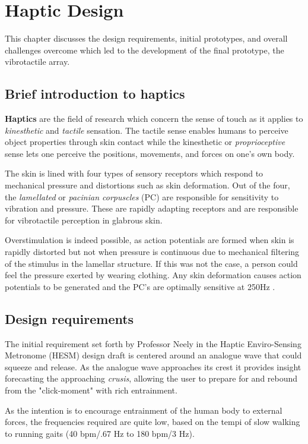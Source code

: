 \chapter{Haptic Design}
This chapter discusses the design requirements, initial prototypes, and overall challenges overcome which led to the development of the final prototype, the vibrotactile array.

\section{Brief introduction to haptics}
\textbf{Haptics} are the field of research which concern the sense of touch as it applies to \textit{kinesthetic} and \textit{tactile} sensation. The tactile sense enables humans to perceive object properties through skin contact while the kinesthetic or \textit{proprioceptive} sense lets one perceive the positions, movements, and forces on one's own body. 

The skin is lined with four types of sensory receptors which respond to mechanical pressure and distortions such as skin deformation. Out of the four, the \textit{lamellated} or \textit{pacinian corpuscles} (PC) are responsible for sensitivity to vibration and pressure. These are rapidly adapting receptors and are responsible for vibrotactile perception in glabrous skin. 

Overstimulation is indeed possible, as action potentials are formed when skin is rapidly distorted but not when pressure is continuous due to mechanical filtering of the stimulus in the lamellar structure. If this was not the case, a person could feel the pressure exerted by wearing clothing.
Any skin deformation causes action potentials to be generated and the PC's are optimally sensitive at 250Hz \cite{choi2013vibrotactile}.

\section{Design requirements}

The initial requirement set forth by Professor Neely in the Haptic Enviro-Sensing Metronome (HESM) design draft is centered around an analogue wave that could squeeze and release. As the analogue wave approaches its crest it provides insight forecasting the approaching \textit{crusis}, allowing the user to prepare for and rebound from the "click-moment" with rich entrainment.

As the intention is to encourage entrainment of the human body to external forces, the frequencies
required are quite low, based on the tempi of slow walking to running gaits
(40 bpm/.67 Hz to 180 bpm/3 Hz).

